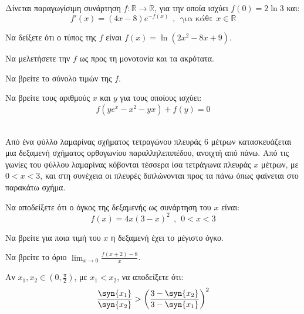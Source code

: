 \documentclass[twoside,nofonts,internet,math,spyros]{frontisthrio-diag}
\begin{document}
\begin{thema}
\item \mbox{}\\
Δίνεται παραγωγίσιμη συνάρτηση $ f:\mathbb{R}\to\mathbb{R} $, για την οποία ισχύει $ f(0)=2\ln{3} $ και:
\[ f'(x)=(4x-8)e^{-f(x)}\ \ ,\ \ \textrm{για κάθε }x\in\mathbb{R} \]
\begin{erwthma}
\item Να δείξετε ότι ο τύπος της $ f $ είναι $ f(x)=\ln{\left(2x^2-8x+9\right) } $.
\item Να μελετήσετε την $ f $ ως προς τη μονοτονία και τα ακρότατα.
\item Να βρείτε το σύνολο τιμών της $ f $.
\item Να βρείτε τους αριθμούς $ x $ και $ y $ για τους οποίους ισχύει:
\[ f\left( ye^x-x^2-yx\right)+f(y)=0 \]
\end{erwthma}
\item \mbox{}\\
Από ένα φύλλο λαμαρίνας σχήματος τετραγώνου πλευράς $ 6 $ μέτρων κατασκευάζεται μια δεξαμενή σχήματος ορθογωνίου παραλληλεπιπέδου, ανοιχτή από πάνω. Από τις γωνίες του φύλλου λαμαρίνας κόβονται τέσσερα ίσα τετράγωνα πλευράς $ x $ μέτρων, με $ 0<x<3 $, και στη συνέχεια οι πλευρές διπλώνονται προς τα πάνω όπως φαίνεται στο παρακάτω σχήμα.
\begin{center}
\end{center}
\begin{erwthma}
\item Να αποδείξετε ότι ο όγκος της δεξαμενής ως συνάρτηση του $ x $ είναι:
\[ f(x)=4x(3-x)^2\ \ ,\ \ 0<x<3 \]
\item Να βρείτε για ποια τιμή του $ x $ η δεξαμενή έχει το μέγιστο όγκο.
\item Να βρείτε το όριο $ {\displaystyle{\lim_{x\to 0}{\frac{f(x+2)-8}{x}}}} $.
\item Αν $ x_1,x_2\in\left(0,\frac{\pi}{2} \right) $, με $ x_1<x_2 $, να αποδείξετε ότι:
\[ \frac{\syn{x_1}}{\syn{x_2}}>\left(\frac{3-\syn{x_2}}{3-\syn{x_1}} \right)^2  \]
\end{erwthma}
\end{thema}
\kaliepityxia
\end{document}
